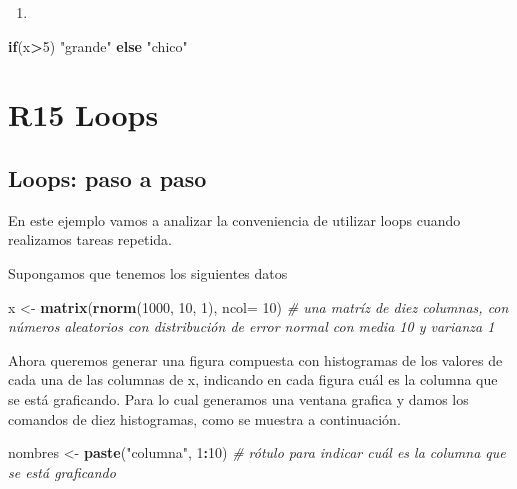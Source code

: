 \documentclass[]{book}
\newenvironment{Shaded}{\begin{snugshade}}{\end{snugshade}}
\newcommand{\CommentTok}[1]{\textcolor[rgb]{0.56,0.35,0.01}{\textit{#1}}}
\newcommand{\ControlFlowTok}[1]{\textcolor[rgb]{0.13,0.29,0.53}{\textbf{#1}}}
\newcommand{\DataTypeTok}[1]{\textcolor[rgb]{0.13,0.29,0.53}{#1}}
\newcommand{\DecValTok}[1]{\textcolor[rgb]{0.00,0.00,0.81}{#1}}
\newcommand{\KeywordTok}[1]{\textcolor[rgb]{0.13,0.29,0.53}{\textbf{#1}}}
\newcommand{\NormalTok}[1]{#1}
\newcommand{\OperatorTok}[1]{\textcolor[rgb]{0.81,0.36,0.00}{\textbf{#1}}}
\newcommand{\StringTok}[1]{\textcolor[rgb]{0.31,0.60,0.02}{#1}}
\begin{document}
\begin{enumerate}
\def\labelenumi{\arabic{enumi}.}
\setcounter{enumi}{4}
\item
\end{enumerate}

\begin{Shaded}
\begin{Highlighting}[]
\ControlFlowTok{if}\NormalTok{(x}\OperatorTok{>}\DecValTok{5}\NormalTok{) }\StringTok{"grande"} \ControlFlowTok{else} \StringTok{"chico"}
\end{Highlighting}
\end{Shaded}

\hypertarget{r15-loops}{%
\chapter*{R15 Loops}\label{r15-loops}}

\hypertarget{loops-paso-a-paso}{%
\section{Loops: paso a paso}\label{loops-paso-a-paso}}

En este ejemplo vamos a analizar la conveniencia de utilizar loops cuando realizamos tareas repetida.

Supongamos que tenemos los siguientes datos

\begin{Shaded}
\begin{Highlighting}[]
\NormalTok{x <-}\StringTok{ }\KeywordTok{matrix}\NormalTok{(}\KeywordTok{rnorm}\NormalTok{(}\DecValTok{1000}\NormalTok{, }\DecValTok{10}\NormalTok{, }\DecValTok{1}\NormalTok{), }\DataTypeTok{ncol=} \DecValTok{10}\NormalTok{) }\CommentTok{# una matríz de diez columnas, con números aleatorios con distribución de error normal con media 10 y varianza 1}
\end{Highlighting}
\end{Shaded}

Ahora queremos generar una figura compuesta con histogramas de los valores de cada una de las columnas de x, indicando en cada figura cuál es la columna que se está graficando. Para lo cual generamos una ventana grafica y damos los comandos de diez histogramas, como se muestra a continuación.

\begin{Shaded}
\begin{Highlighting}[]
\NormalTok{nombres <-}\StringTok{ }\KeywordTok{paste}\NormalTok{(}\StringTok{"columna"}\NormalTok{, }\DecValTok{1}\OperatorTok{:}\DecValTok{10}\NormalTok{) }\CommentTok{# rótulo para indicar cuál es la columna que se está graficando}
\end{Highlighting}
\end{Shaded}
\end{document}
